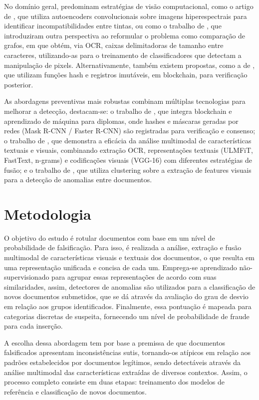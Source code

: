 \documentclass[12pt]{article}
\begin{document}
No domínio geral, predominam estratégias de visão computacional, como o artigo de \cite{inkcnn}, que utiliza autoencoders convolucionais sobre imagens hiperespectrais para identificar incompatibilidades entre tintas, ou como o trabalho de \cite{ocrgraph}, que introduziram outra perspectiva ao reformular o problema como comparação de grafos, em que obtém, via OCR, caixas delimitadoras de tamanho entre caracteres, utilizando-as para o treinamento de classificadores que detectam a manipulação de pixels. Alternativamente, também existem propostas, como a de \cite{hashdetection}, que utilizam funções hash e registros imutáveis, em blockchain, para verificação posterior.

As abordagens preventivas mais robustas combinam múltiplas tecnologias para melhorar a detecção, destacam-se: o trabalho de \cite{blockchainforgery}, que integra blockchain e aprendizado de máquina para diplomas, onde hashes e máscaras geradas por redes (Mask R-CNN / Faster R-CNN) são registradas para verificação e consenso; o trabalho de \cite{multimodal}, que demonstra a eficácia da análise multimodal de características textuais e visuais, combinando extração OCR, representações textuais (ULMFiT, FastText, n-grams) e codificações visuais (VGG-16) com diferentes estratégias de fusão; e o trabalho de \cite{clusterfraudverification}, que utiliza clustering sobre a extração de features visuais para a detecção de anomalias entre documentos.

\section{Metodologia}

O objetivo do estudo é rotular documentos com base em um nível de probabilidade de falsificação. Para isso, é realizada a análise, extração e fusão multimodal de características visuais e textuais dos documentos, o que resulta em uma representação unificada e concisa de cada um. Emprega-se aprendizado não-supervisionado para agrupar essas representações de acordo com suas similaridades, assim, detectores de anomalias são utilizados para a classificação de novos documentos submetidos, que se dá através da avaliação do grau de desvio em relação aos grupos identificados. Finalmente, essa pontuação é mapeada para categorias discretas de suspeita, fornecendo um nível de probabilidade de fraude para cada inserção.

A escolha dessa abordagem tem por base a premissa de que documentos falsificados apresentam inconsistências sutis, tornando-os atípicos em relação aos padrões estabelecidos por documentos legítimos, sendo detectáveis através da análise multimodal das características extraídas de diversos contextos. Assim, o processo completo consiste em duas etapas: treinamento dos modelos de referência e classificação de novos documentos.
\end{document}
